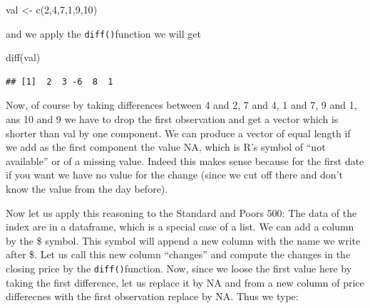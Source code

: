 \documentclass[
]{book}
\newenvironment{Shaded}{\begin{snugshade}}{\end{snugshade}}
\newcommand{\ConstantTok}[1]{\textcolor[rgb]{0.00,0.00,0.00}{#1}}
\newcommand{\DecValTok}[1]{\textcolor[rgb]{0.00,0.00,0.81}{#1}}
\newcommand{\FunctionTok}[1]{\textcolor[rgb]{0.00,0.00,0.00}{#1}}
\newcommand{\NormalTok}[1]{#1}
\newcommand{\OtherTok}[1]{\textcolor[rgb]{0.56,0.35,0.01}{#1}}
\newcommand{\SpecialCharTok}[1]{\textcolor[rgb]{0.00,0.00,0.00}{#1}}
\begin{document}
\begin{Shaded}
\begin{Highlighting}[]
\NormalTok{val }\OtherTok{\textless{}{-}} \FunctionTok{c}\NormalTok{(}\DecValTok{2}\NormalTok{,}\DecValTok{4}\NormalTok{,}\DecValTok{7}\NormalTok{,}\DecValTok{1}\NormalTok{,}\DecValTok{9}\NormalTok{,}\DecValTok{10}\NormalTok{)}
\end{Highlighting}
\end{Shaded}

and we apply the \texttt{diff()}function we will get

\begin{Shaded}
\begin{Highlighting}[]
\FunctionTok{diff}\NormalTok{(val)}
\end{Highlighting}
\end{Shaded}

\begin{verbatim}
## [1]  2  3 -6  8  1
\end{verbatim}

Now, of course by taking differences between 4 and 2, 7 and 4, 1 and 7, 9 and 1, ans 10 and 9 we
have to drop the first observation and get a vector which is shorter than val by one component.
We can
produce a vector of equal length if we add as the first component the value NA, which is
R's symbol of ``not available'' or of a missing value. Indeed this makes sense because for the
first date if you want we have no value for the change (since we cut off there and don't know
the value from the day before).

Now let us apply this reasoning to the Standard and Poors 500: The data of the index are in a
dataframe, which is a special case of a list. We can add a column by the \$ symbol. This
symbol will append a new column with the name we write after \$. Let us call this new
column ``changes'' and compute the changes in the closing price by the \texttt{diff()}function.
Now, since we loose the first value here by taking the first difference, let us
replace it by NA and from a new column of price differecnes with the first observation
replace by NA. Thus we type:

\begin{Shaded}
\end{Shaded}
\end{document}
